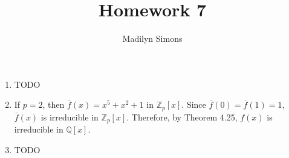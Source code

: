 \documentclass{article}
\title{Homework 7}
\author{Madilyn Simons}
\date{}
\begin{document}
\maketitle

\begin{enumerate}

\item TODO

\item If $p = 2$, then $\overline{f}(x) = x^5 + x^2 + 1$ in $\mathbb{Z}_{p}[x]$.
Since $\overline{f}(0) = \overline{f}(1) = 1$, $\overline{f}(x)$ is
irreducible in $\mathbb{Z}_{p}[x]$.  Therefore, by Theorem 4.25, $f(x)$ is
irreducible in $\mathbb{Q}[x]$.

\item TODO

\end{enumerate}
\end{document}
